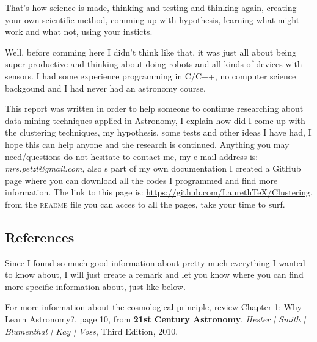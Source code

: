 That's how science is made, thinking and testing and thinking again, creating your own scientific method, comming up with hypothesis, learning what might work and what not, using your insticts. 

Well, before comming here I didn't think like that, it was just all about being super productive and thinking about doing robots and all kinds of devices with sensors. I had some experience programming in C/C++, no computer science backgound and I had never had an astronomy course.

This report was written in order to help someone to continue researching about data mining techniques applied in Astronomy, I explain how did I come up with the clustering techniques, my hypothesis, some tests and other ideas I have had, I hope this can help anyone and the research is continued. Anything you may need/questions do not hesitate to contact me, my e-mail address is: \emph{mrs.petzl@gmail.com}, also s part of my own documentation I created a GitHub page where you can download all the codes I programmed and find more information. The link to this page is: \url{https://github.com/LaurethTeX/Clustering}, from the \textsc{readme} file you can acces to all the pages, take your time to surf.

\subsection{References}

Since I found so much good information about pretty much everything I wanted to know about, I will just create a remark and let you know where you can find more specific information about, just like below.


\begin{expli}
For more information about the cosmological principle, review Chapter 1: Why Learn Astronomy?, page 10, from \textbf{21st Century Astronomy}, \textit{Hester | Smith | Blumenthal | Kay | Voss}, Third Edition, 2010.
\end{expli}



